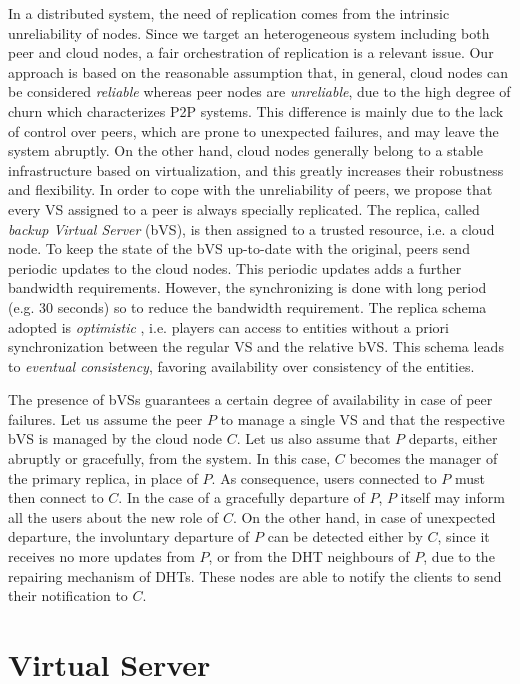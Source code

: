 \documentclass[final,10pt,a5paper]{phdimt}
\theoremstyle{definition}
\begin{document}
In a distributed system, the need of replication comes from the intrinsic unreliability of nodes. 
Since we target an heterogeneous system including both peer and cloud nodes, a fair orchestration of replication is a relevant issue.
Our approach is based on the reasonable assumption that, in general, cloud nodes can be considered \textit{reliable} whereas peer nodes are \textit{unreliable}, due to the high degree of churn which characterizes P2P systems.
This difference is mainly due to the lack of control over peers, which are prone to unexpected failures, and may leave the system 
abruptly. On the other hand, cloud nodes generally belong to a stable infrastructure based on virtualization, and this greatly increases their robustness and flexibility. 
In order to cope with the unreliability of peers, we propose that every VS assigned to a peer is always specially replicated.
The replica, called \textit{backup Virtual Server} (bVS), is then assigned to a trusted resource, i.e. a cloud node. 
To keep the state of the bVS up-to-date with the original, peers send periodic updates to the cloud nodes.
This periodic updates adds a further bandwidth requirements.
However, the synchronizing is done with long period (e.g. 30 seconds) so to reduce the bandwidth requirement.
The replica schema adopted is \textit{optimistic} \cite{saito2005optimistic}, i.e. players can access to entities without a priori synchronization between the regular VS and the relative bVS.
This schema leads to \textit{eventual consistency}, favoring availability over consistency of the entities.


The presence of bVSs guarantees a certain degree of availability in case of peer failures. 
Let us assume the peer $P$ to manage a single VS and that the respective bVS is managed by the cloud node $C$.
Let us also assume that $P$ departs, either abruptly or gracefully, from the system. 
In this case, $C$ becomes the manager of the primary replica, in place of $P$.
As consequence, users connected to $P$ must then connect to $C$. 
In the case of a gracefully departure of $P$, $P$ itself may inform all the users about the new role of $C$. 
On the other hand, in case of unexpected departure, the involuntary departure of $P$ can be detected either by $C$, since it receives no more updates from $P$, or from the DHT neighbours of $P$, due to the repairing mechanism of DHTs. 
These nodes are able to notify the clients to send their notification to $C$.




\section{Virtual Server}
\label{sec:migration}
\end{document}

